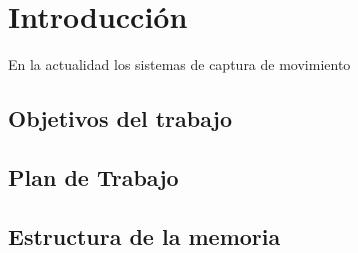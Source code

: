 %
%



\chapter{Introducción}
\label{cap1:sec:introduccion}

En la actualidad los sistemas de captura de movimiento 


\section{Objetivos del trabajo}

\section{Plan de Trabajo}

\section{Estructura de la memoria}


